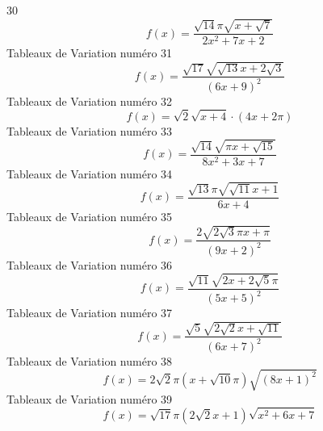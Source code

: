 \documentclass{article}
\begin{document}
30 \[f(x) = \frac{\sqrt{14} \pi \sqrt{x + \sqrt{7}}}{2 x^{2} + 7 x + 2}\]Tableaux de Variation num\'ero 31 \[f(x) = \frac{\sqrt{17} \sqrt{\sqrt{13} x + 2 \sqrt{3}}}{\left(6 x + 9\right)^{2}}\]Tableaux de Variation num\'ero 32 \[f(x) = \sqrt{2} \sqrt{x + 4} \cdot \left(4 x + 2 \pi\right)\]Tableaux de Variation num\'ero 33 \[f(x) = \frac{\sqrt{14} \sqrt{\pi x + \sqrt{15}}}{8 x^{2} + 3 x + 7}\]Tableaux de Variation num\'ero 34 \[f(x) = \frac{\sqrt{13} \pi \sqrt{\sqrt{11} x + 1}}{6 x + 4}\]Tableaux de Variation num\'ero 35 \[f(x) = \frac{2 \sqrt{2 \sqrt{3} \pi x + \pi}}{\left(9 x + 2\right)^{2}}\]Tableaux de Variation num\'ero 36 \[f(x) = \frac{\sqrt{11} \sqrt{2 x + 2 \sqrt{5} \pi}}{\left(5 x + 5\right)^{2}}\]Tableaux de Variation num\'ero 37 \[f(x) = \frac{\sqrt{5} \sqrt{2 \sqrt{2} x + \sqrt{11}}}{\left(6 x + 7\right)^{2}}\]Tableaux de Variation num\'ero 38 \[f(x) = 2 \sqrt{2} \pi \left(x + \sqrt{10} \pi\right) \sqrt{\left(8 x + 1\right)^{2}}\]Tableaux de Variation num\'ero 39 \[f(x) = \sqrt{17} \pi \left(2 \sqrt{2} x + 1\right) \sqrt{x^{2} + 6 x + 7}\]
\end{document}
